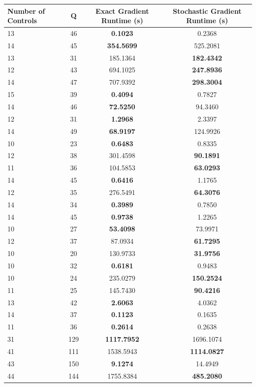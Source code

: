 \documentclass{article}
\begin{document}
\begin{table}[h]
\centering
\begin{tabular}{lccc}
\toprule
Number of Controls & Q & Exact Gradient Runtime (s) & Stochastic Gradient Runtime (s) \\
\midrule
13 & 46 & \textbf{0.1023} & 0.2368 \\
14 & 45 & \textbf{354.5699} & 525.2081 \\
13 & 31 & 185.1364 & \textbf{182.4342} \\
12 & 43 & 694.1025 & \textbf{247.8936} \\
14 & 47 & 707.9392 & \textbf{298.3004} \\
15 & 39 & \textbf{0.4094} & 0.7827 \\
14 & 46 & \textbf{72.5250} & 94.3460 \\
12 & 31 & \textbf{1.2968} & 2.3397 \\
14 & 49 & \textbf{68.9197} & 124.9926 \\
10 & 23 & \textbf{0.6483} & 0.8335 \\
12 & 38 & 301.4598 & \textbf{90.1891} \\
11 & 36 & 104.5853 & \textbf{63.0293} \\
14 & 45 & \textbf{0.6416} & 1.1765 \\
12 & 35 & 276.5491 & \textbf{64.3076} \\
14 & 34 & \textbf{0.3989} & 0.7850 \\
14 & 45 & \textbf{0.9738} & 1.2265 \\
10 & 27 & \textbf{53.4098} & 73.9971 \\
12 & 37 & 87.0934 & \textbf{61.7295} \\
10 & 20 & 130.9733 & \textbf{31.9756} \\
10 & 32 & \textbf{0.6181} & 0.9483 \\
10 & 24 & 235.0279 & \textbf{150.2524} \\
11 & 25 & 145.7430 & \textbf{90.4216} \\
13 & 42 & \textbf{2.6063} & 4.0362 \\
14 & 37 & \textbf{0.1123} & 0.1635 \\
11 & 36 & \textbf{0.2614} & 0.2638 \\
31 & 129 & \textbf{1117.7952} & 1696.1074 \\
41 & 111 & 1538.5943 & \textbf{1114.0827} \\
43 & 150 & \textbf{9.1274} & 14.4949 \\
44 & 144 & 1755.8384 & \textbf{485.2080} \\

\end{tabular}
\end{table}
\end{document}
